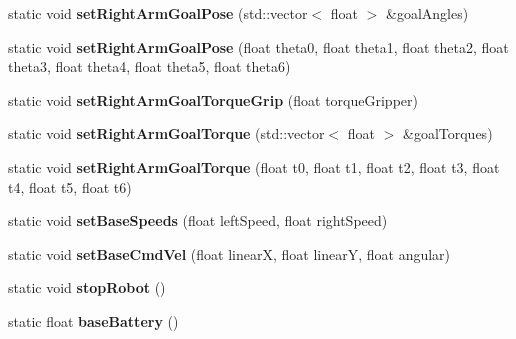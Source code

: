 \begin{DoxyCompactItemize}
\item 
static void {\bfseries set\+Right\+Arm\+Goal\+Pose} (std\+::vector$<$ float $>$ \&goal\+Angles)\hypertarget{class_justina_hardware_a28d777823baadf044495fb30d079aad7}{}\label{class_justina_hardware_a28d777823baadf044495fb30d079aad7}

\item 
static void {\bfseries set\+Right\+Arm\+Goal\+Pose} (float theta0, float theta1, float theta2, float theta3, float theta4, float theta5, float theta6)\hypertarget{class_justina_hardware_af541078cebeceddc3a8c87154669d6a4}{}\label{class_justina_hardware_af541078cebeceddc3a8c87154669d6a4}

\item 
static void {\bfseries set\+Right\+Arm\+Goal\+Torque\+Grip} (float torque\+Gripper)\hypertarget{class_justina_hardware_ac5f2ef7dfc855504492293bc71c2a3bd}{}\label{class_justina_hardware_ac5f2ef7dfc855504492293bc71c2a3bd}

\item 
static void {\bfseries set\+Right\+Arm\+Goal\+Torque} (std\+::vector$<$ float $>$ \&goal\+Torques)\hypertarget{class_justina_hardware_af2c0a2181a324b538b0473cf83339dec}{}\label{class_justina_hardware_af2c0a2181a324b538b0473cf83339dec}

\item 
static void {\bfseries set\+Right\+Arm\+Goal\+Torque} (float t0, float t1, float t2, float t3, float t4, float t5, float t6)\hypertarget{class_justina_hardware_a00dfa269d060fa023189c2f03adc4a89}{}\label{class_justina_hardware_a00dfa269d060fa023189c2f03adc4a89}

\item 
static void {\bfseries set\+Base\+Speeds} (float left\+Speed, float right\+Speed)\hypertarget{class_justina_hardware_a3f4ff43fd4315912b13cf85431b5caed}{}\label{class_justina_hardware_a3f4ff43fd4315912b13cf85431b5caed}

\item 
static void {\bfseries set\+Base\+Cmd\+Vel} (float linearX, float linearY, float angular)\hypertarget{class_justina_hardware_a52de80431587900cc49d44a30f669b2c}{}\label{class_justina_hardware_a52de80431587900cc49d44a30f669b2c}

\item 
static void {\bfseries stop\+Robot} ()\hypertarget{class_justina_hardware_af4950ae74c3304dcf02b4986b8745e08}{}\label{class_justina_hardware_af4950ae74c3304dcf02b4986b8745e08}

\item 
static float {\bfseries base\+Battery} ()\hypertarget{class_justina_hardware_a31929396f30201036bf871be120e6893}{}\label{class_justina_hardware_a31929396f30201036bf871be120e6893}


\end{DoxyCompactItemize}

